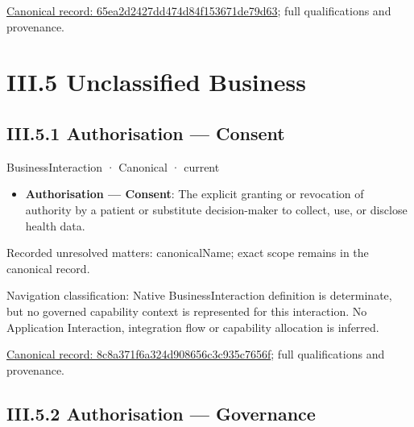 {\footnotesize \href{../../../../../../../continuum/business/business-function/65ea2d2427dd474d84f153671de79d63.md}{Canonical record: 65ea2d2427dd474d84f153671de79d63}; full qualifications and provenance.}\par
\chapter*{III.5 Unclassified Business}
\label{navigation:III.5}

\section*{III.5.1 Authorisation — Consent}
\label{navigation:III.5.1}

\label{element:8c8a371f6a324d908656c3c935c7656f}
{\small BusinessInteraction · Canonical · current}\par

\begin{itemize}


\item \textbf{Authorisation — Consent}: The explicit granting or revocation of authority by a patient or substitute decision-maker to collect, use, or disclose health data.

\end{itemize}

{\small Recorded unresolved matters: canonicalName; exact scope remains in the canonical record.}\par
{\small Navigation classification: Native BusinessInteraction definition is determinate, but no governed capability context is represented for this interaction. No Application Interaction, integration flow or capability allocation is inferred.}\par
{\footnotesize \href{../../../../../../../continuum/business/business-interaction/8c8a371f6a324d908656c3c935c7656f.md}{Canonical record: 8c8a371f6a324d908656c3c935c7656f}; full qualifications and provenance.}\par
\section*{III.5.2 Authorisation — Governance}
\label{navigation:III.5.2}

